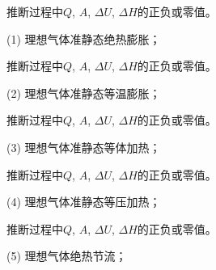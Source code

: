 \documentclass[CJK]{beamer}
\begin{document}
\begin{frame}
\bch


推断过程中$Q$, $A$, $\Delta U$, $\Delta H$的正负或零值。

\bitem
\item[(1)]{理想气体准静态绝热膨胀；}
\eitem

\ech
\end{frame}

\begin{frame}
\bch


推断过程中$Q$, $A$, $\Delta U$, $\Delta H$的正负或零值。

\bitem
\item[(2)]{理想气体准静态等温膨胀；}
\eitem

\ech
\end{frame}


\begin{frame}
\bch


推断过程中$Q$, $A$, $\Delta U$, $\Delta H$的正负或零值。

\bitem
\item[(3)]{理想气体准静态等体加热；}
\eitem

\ech
\end{frame}

\begin{frame}
\bch


推断过程中$Q$, $A$, $\Delta U$, $\Delta H$的正负或零值。

\bitem
\item[(4)]{理想气体准静态等压加热；}
\eitem

\ech
\end{frame}

\begin{frame}
\bch


推断过程中$Q$, $A$, $\Delta U$, $\Delta H$的正负或零值。

\bitem
\item[(5)]{理想气体绝热节流；}
\eitem

\ech
\end{frame}
\end{document}
